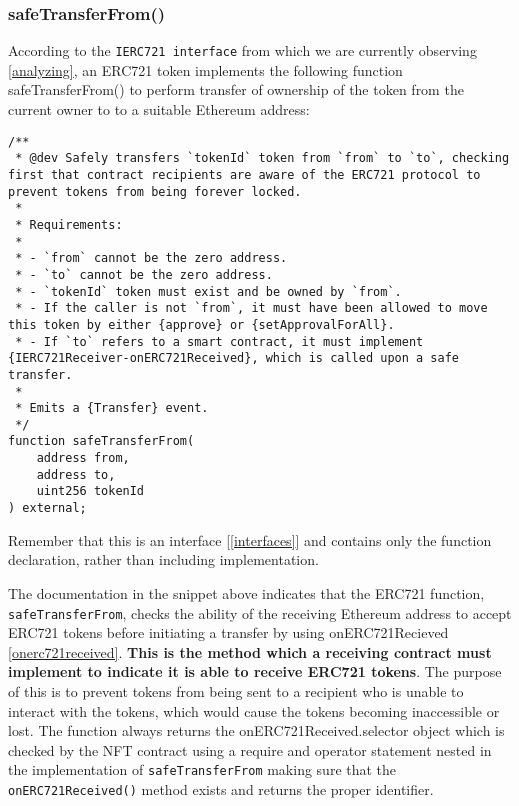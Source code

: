 \documentclass{article}
\theoremstyle{theorem}
\theoremstyle{definition}
\theoremstyle{remark}
\begin{document}
\subsubsection{safeTransferFrom()} \label{safetransferfrom}
According to the \texttt{IERC721 interface} from which we are currently observing \ref{analyzing}, an ERC721 token implements the following function \colorbox{Gainsboro!60!Lavender}{safeTransferFrom()} to perform transfer of ownership of the token from the current owner to to a suitable Ethereum address:

\begin{itemize}
\begin{lstlisting}
/**
 * @dev Safely transfers `tokenId` token from `from` to `to`, checking first that contract recipients are aware of the ERC721 protocol to prevent tokens from being forever locked.
 *
 * Requirements:
 *
 * - `from` cannot be the zero address.
 * - `to` cannot be the zero address.
 * - `tokenId` token must exist and be owned by `from`.
 * - If the caller is not `from`, it must have been allowed to move this token by either {approve} or {setApprovalForAll}.
 * - If `to` refers to a smart contract, it must implement {IERC721Receiver-onERC721Received}, which is called upon a safe transfer.
 *
 * Emits a {Transfer} event.
 */
function safeTransferFrom( 
    address from, 
    address to, 
    uint256 tokenId 
) external;
\end{lstlisting}
\end{itemize}

\medskip\noindent
Remember that this is an interface [\ref{interfaces}] and contains only the function declaration, rather than including implementation. 

\medskip\noindent
The documentation in the snippet above indicates that the ERC721 function, \texttt{safeTransferFrom}, checks the ability of the receiving Ethereum address to accept ERC721 tokens before initiating a transfer by using \colorbox{Gainsboro!60!Lavender}{onERC721Recieved} \ref{onerc721received}. \textbf{This is the method which a receiving contract must implement to indicate it is able to receive ERC721 tokens}. The purpose of this is to prevent tokens from being sent to a recipient who is unable to interact with the tokens, which would cause the tokens becoming inaccessible or lost. The function always returns the \colorbox{Gainsboro!60!Lavender}{onERC721Received.selector} object which is checked by the NFT contract using a require and operator statement nested in the implementation of  \texttt{safeTransferFrom} making sure that the \texttt{onERC721Received()} method exists and returns the proper identifier.
\end{document}
